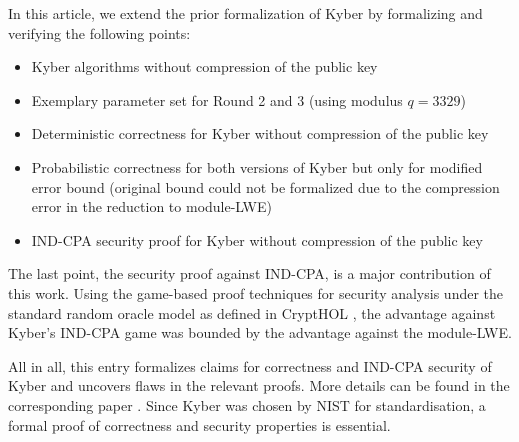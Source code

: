 \documentclass[11pt,a4paper]{article}
\begin{document}
In this article, we extend the prior formalization of Kyber \cite{Formalization} 
by formalizing and verifying the following points:
\begin{itemize}
\item Kyber algorithms without compression of the public key
\item Exemplary parameter set for Round 2 and 3 (using modulus $q=3329$)
\item Deterministic correctness for Kyber without compression of the public key
\item Probabilistic correctness for both versions of Kyber but only for modified error bound (original bound could not be formalized due to the compression error in the reduction to module-LWE)
\item IND-CPA security proof for Kyber without compression of the public key
\end{itemize}

The last point, the security proof against IND-CPA, is a major contribution of this work.
Using the game-based proof techniques for security analysis under the standard random oracle model as defined in CryptHOL \cite{CryptHOL-AFP,CryptHOLTutorial}, the advantage against Kyber's IND-CPA game was bounded by the advantage against the module-LWE.

All in all, this entry formalizes claims for correctness and IND-CPA security of Kyber and uncovers flaws in the relevant proofs. More details can be found in the corresponding paper \cite{PaperTBD}.
Since Kyber was chosen by NIST for standardisation, a formal proof of correctness and security properties is essential.


\vspace{1cm}





\end{document}
